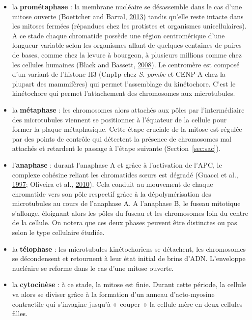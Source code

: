 \documentclass[12pt,a4paper,twoside,openright]{book}
\begin{document}
\begin{itemize}
\item
  la \textbf{prométaphase} : la membrane nucléaire se désassemble dans
  le cas d'une mitose ouverte (Boettcher and Barral,
  \protect\hyperlink{ref-Boettcher2013}{2013}) tandis qu'elle reste
  intacte dans les mitoses fermées (répandues chez les protistes et
  organismes unicellulaires). A ce stade chaque chromatide possède une
  région centromérique d'une longueur variable selon les organismes
  allant de quelques centaines de paires de bases, comme chez la levure
  à bourgeon, à plusieurs millions comme chez les cellules humaines
  (Black and Bassett, \protect\hyperlink{ref-Black2008}{2008}). Le
  centromère est composé d'un variant de l'histone H3 (Cnp1p chez
  \emph{S. pombe} et CENP-A chez la plupart des mammifères) qui permet
  l'assemblage du kinétochore. C'est le kinétochore qui permet
  l'attachement des chromosomes aux microtubules.
\item
  la \textbf{métaphase} : les chromosomes alors attachés aux pôles par
  l'intermédiaire des microtubules viennent se positionner à l'équateur
  de la cellule pour former la plaque métaphasique. Cette étape cruciale
  de la mitose est régulée par des points de contrôle qui détectent la
  présence de chromosomes mal attachés et retardent le passage à l'étape
  suivante (Section~\ref{sec:sac}).
\item
  l'\textbf{anaphase} : durant l'anaphase A et grâce à l'activation de
  l'APC, le complexe cohésine reliant les chromatides sœurs est dégradé
  (Guacci et al., \protect\hyperlink{ref-Guacci1997}{1997}; Oliveira et
  al., \protect\hyperlink{ref-Oliveira2010}{2010}). Cela conduit au
  mouvement de chaque chromatide vers son pôle respectif grâce à la
  dépolymérisation des microtubules au cours de l'anaphase A. A
  l'anaphase B, le fuseau mitotique s'allonge, éloignant alors les pôles
  du fuseau et les chromosomes loin du centre de la cellule. On notera
  que ces deux phases peuvent être distinctes ou pas selon le type
  cellulaire étudiée.
\item
  la \textbf{télophase} : les microtubules kinétochoriens se détachent,
  les chromosomes se décondensent et retournent à leur état initial de
  brins d'ADN. L'enveloppe nucléaire se reforme dans le cas d'une mitose
  ouverte.
\item
  la \textbf{cytocinèse} : à ce stade, la mitose est finie. Durant cette
  période, la cellule va alors se diviser grâce à la formation d'un
  anneau d'acto-myosine contractile qui s'invagine jusqu'à «~couper~» la
  cellule mère en deux cellules filles.
\end{itemize}
\end{document}
